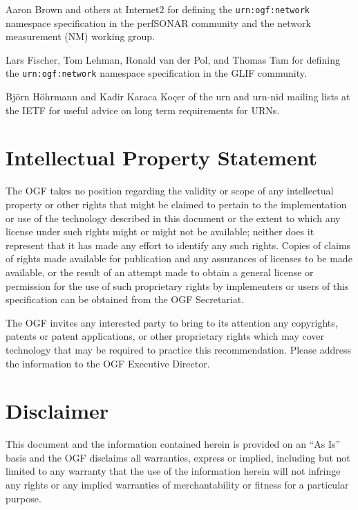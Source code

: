 \documentclass[12pt]{article}  %
\begin{document}
Aaron Brown and others at Internet2 for defining the \texttt{urn:ogf:network} namespace specification in the perfSONAR community and the network measurement (NM) working group.

Lars Fischer, Tom Lehman, Ronald van der Pol, and Thomas Tam for defining the \texttt{urn:ogf:network} namespace specification in the GLIF community.

Björn Höhrmann and Kadir Karaca Koçer of the urn and urn-nid mailing lists at the IETF for useful advice on long term requirements for URNs.

\section*{Intellectual Property Statement}

The OGF takes no position regarding the validity or scope of any intellectual
property or other rights that might be claimed to pertain to the
implementation or use of the technology described in this document or the
extent to which any license under such rights might or might not be
available; neither does it represent that it has made any effort to identify
any such rights. Copies of claims of rights made available for publication
and any assurances of licenses to be made available, or the result of an
attempt made to obtain a general license or permission for the use of such
proprietary rights by implementers or users of this specification can be
obtained from the OGF Secretariat.

The OGF invites any interested party to bring to its attention any
copyrights, patents or patent applications, or other proprietary rights which
may cover technology that may be required to practice this recommendation.
Please address the information to the OGF Executive Director.

\section*{Disclaimer}

This document and the information contained herein is provided on an ``As
Is'' basis and the OGF disclaims all warranties, express or implied,
including but not limited to any warranty that the use of the information
herein will not infringe any rights or any implied warranties of
merchantability or fitness for a particular purpose.
\end{document}
